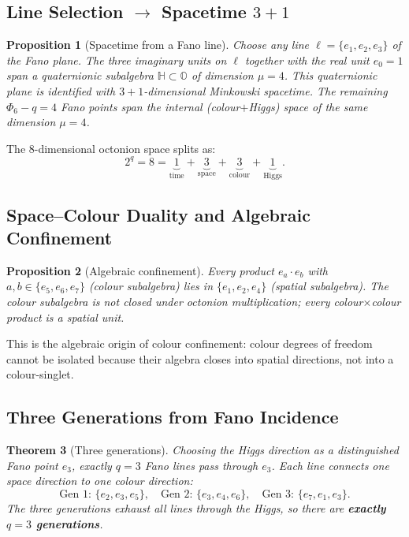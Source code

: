 \documentclass[12pt,a4paper]{article}
\newtheorem{theorem}{Theorem}[section]
\newtheorem{proposition}[theorem]{Proposition}
\begin{document}
\subsection{Line Selection $\to$ Spacetime $3+1$}

\begin{proposition}[Spacetime from a Fano line]\label{prop:spacetime}
Choose any line $\ell=\{e_1,e_2,e_3\}$ of the Fano plane. The three imaginary
units on $\ell$ together with the real unit $e_0=1$ span a quaternionic
subalgebra $\mathbb{H}\subset\mathbb{O}$ of dimension $\mu=4$. This
quaternionic plane is identified with $3+1$-dimensional Minkowski spacetime.
The remaining $\Phi_6-q=4$ Fano points span the internal
(colour$+$Higgs) space of the same dimension $\mu=4$.
\end{proposition}

The 8-dimensional octonion space splits as:
\begin{equation}\label{eq:octsplit}
  2^q = 8 = \underbrace{1}_{\text{time}} + \underbrace{3}_{\text{space}}
  + \underbrace{3}_{\text{colour}} + \underbrace{1}_{\text{Higgs}}.
\end{equation}

\subsection{Space--Colour Duality and Algebraic Confinement}

\begin{proposition}[Algebraic confinement]\label{prop:confinement}
Every product $e_a\cdot e_b$ with $a,b\in\{e_5,e_6,e_7\}$ (colour subalgebra)
lies in $\{e_1,e_2,e_4\}$ (spatial subalgebra). The colour subalgebra is
\emph{not closed} under octonion multiplication; every colour$\times$colour
product is a spatial unit.
\end{proposition}

This is the algebraic origin of colour confinement: colour degrees of freedom
cannot be isolated because their algebra closes into spatial directions, not
into a colour-singlet.

\subsection{Three Generations from Fano Incidence}

\begin{theorem}[Three generations]\label{thm:threegen}
Choosing the Higgs direction as a distinguished Fano point $e_3$, exactly
$q=3$ Fano lines pass through $e_3$. Each line connects one space direction
to one colour direction:
\begin{equation}\label{eq:generations}
  \text{Gen 1: } \{e_2,e_3,e_5\},\quad
  \text{Gen 2: } \{e_3,e_4,e_6\},\quad
  \text{Gen 3: } \{e_7,e_1,e_3\}.
\end{equation}
The three generations exhaust all lines through the Higgs, so there are
\textbf{exactly $q=3$ generations}.
\end{theorem}
\end{document}

